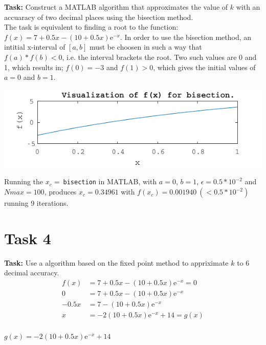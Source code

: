 \documentclass{article}
\begin{document}
  \textbf{Task:}
  Construct a MATLAB algorithm that approximates the value of $k$ with an
  accuaracy of two decimal places using the bisection method. \\

  \noindent
  The task is equivalent to finding a root to the function:
  $ f(x) = 7 + 0.5x - (10 + 0.5x)\mathrm{e}^{-x} $.
  In order to use the bisection method, an intitial x-interval of $[a, b]$ must
  be choosen in such a way that $f(a) * f(b) < 0$, i.e. the interval brackets the
  root. Two such values are 0 and 1, which results in; $f(0) = -3$ and $f(1) >
  0$, which gives the initial values of $a=0$ and $b=1$.

  \begin{center}
    \includegraphics{figs/t3_check.pdf}
  \end{center}

  \noindent
  Running the $x_c =\ $\texttt{bisection} in MATLAB, with $a=0$, $b=1$,
  $\epsilon=0.5*10^{-2}$ and $Nmax=100$, produces $x_c = 0.34961$ with $f(x_c) =
  0.001940 \ ( < 0.5*10^{-2} )$ running 9 iterations.

\section*{Task 4}

  \textbf{Task:} Use a algorithm based on the fixed point method to appriximate
  $k$ to 6 decimal accuracy. \\

  \begin{align*}
     f(x) &= 7 + 0.5x - (10 + 0.5x)\mathrm{e}^{-x} = 0\\
     0  &= 7 + 0.5x - (10 + 0.5x)\mathrm{e}^{-x} \\
     - 0.5x  &= 7 - (10 + 0.5x)\mathrm{e}^{-x} \\
     x  &= -2(10 + 0.5x)\mathrm{e}^{-x} + 14  = g(x)\\
  \end{align*}

  $ g(x) = -2(10 + 0.5x)\mathrm{e}^{-x} + 14 $
\end{document}
